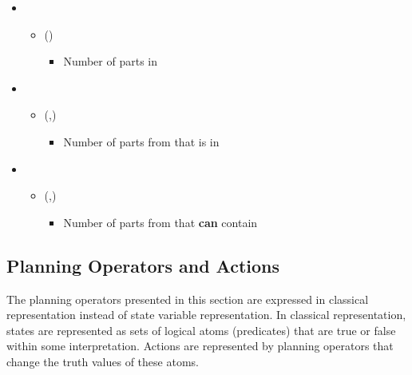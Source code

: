 \begin{itemize}
 \item {}
  \begin{itemize}
   \item {}() 
   \begin{itemize}
   \item Number of parts in 
  \end{itemize}
  
  \end{itemize}

 \item {}
  \begin{itemize}
   \item {}(,)
   \begin{itemize}
   \item Number of parts from  that is in 
  \end{itemize}
  \end{itemize}

     \item {}
  \begin{itemize}
  \item {}(,) 
     \begin{itemize}
   \item Number of parts from  that  \textbf{can} contain
  \end{itemize}
  \end{itemize}
\end{itemize}


\subsection{Planning Operators and Actions}
\label{subsect:Planning_Operators}
The planning operators presented in this section are expressed in classical representation instead of state variable representation. In classical representation, states are represented as sets of logical atoms (predicates) that are true or false within some interpretation. Actions are represented by planning operators that change the truth values of these atoms.


